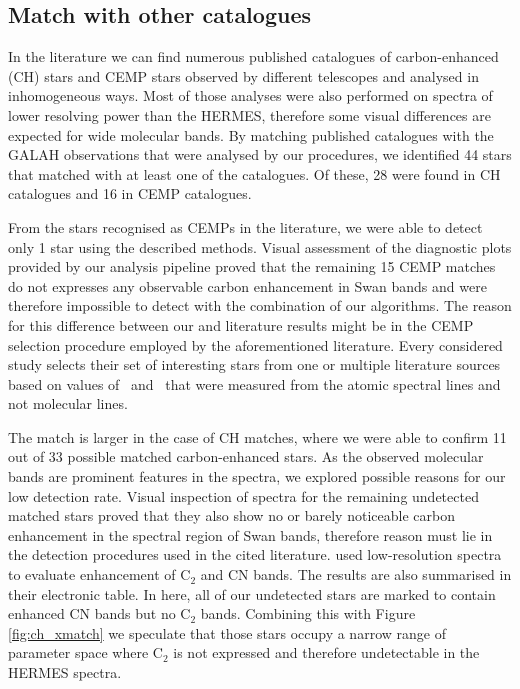 \subsection{Match with other catalogues}
In the literature we can find numerous published catalogues of carbon-enhanced (CH) stars \cite{2001A&A...375..366C, 2001BaltA..10....1A,2016ApJS..226....1J} and CEMP stars \cite{2007ApJ...658..367K, 2010A&A...509A..93M, 2010AJ....139.1051P, 2014ApJ...797...21P, 2015A&A...581A..22A, 2017yCat..18330020Y} observed by different telescopes and analysed in inhomogeneous ways. Most of those analyses were also performed on spectra of lower resolving power than the HERMES, therefore some visual differences are expected for wide molecular bands. By matching published catalogues with the GALAH observations that were analysed by our procedures, we identified 44 stars that matched with at least one of the catalogues. Of these, 28 were found in CH catalogues and 16 in CEMP catalogues.

From the stars recognised as CEMPs in the literature, we were able to detect only 1 star using the described methods. Visual assessment of the diagnostic plots provided by our analysis pipeline proved that the remaining 15 CEMP matches do not expresses any observable carbon enhancement in Swan bands and were therefore impossible to detect with the combination of our algorithms. The reason for this difference between our and literature results might be in the CEMP selection procedure employed by the aforementioned literature. Every considered study selects their set of interesting stars from one or multiple literature sources based on values of \Meh\ and \Cfe\ that were measured from the atomic spectral lines and not molecular lines. 

The match is larger in the case of CH matches, where we were able to confirm 11 out of 33 possible matched carbon-enhanced stars. As the observed molecular bands are prominent features in the spectra, we explored possible reasons for our low detection rate. Visual inspection of spectra for the remaining undetected matched stars proved that they also show no or barely noticeable carbon enhancement in the spectral region of Swan bands, therefore reason must lie in the detection procedures used in the cited literature. \citet{2001A&A...375..366C} used low-resolution spectra to evaluate enhancement of C$_2$ and CN bands. The results are also summarised in their electronic table. In here, all of our undetected stars are marked to contain enhanced CN bands but no C$_2$ bands. Combining this with Figure \ref{fig:ch_xmatch} we speculate that those stars occupy a narrow range of parameter space where C$_2$ is not expressed and therefore undetectable in the HERMES spectra. 

